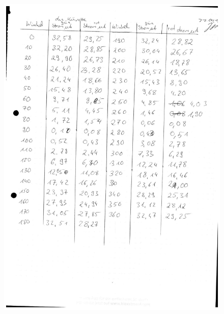\documentclass[fontsize=12pt]{scrartcl}
\begin{document}
\begin{figure}[H]
\vspace{-17pt}
        \includegraphics[scale=0.6]{Graphik/3}
        \vspace{-10pt}

\end{figure}
\end{document}
